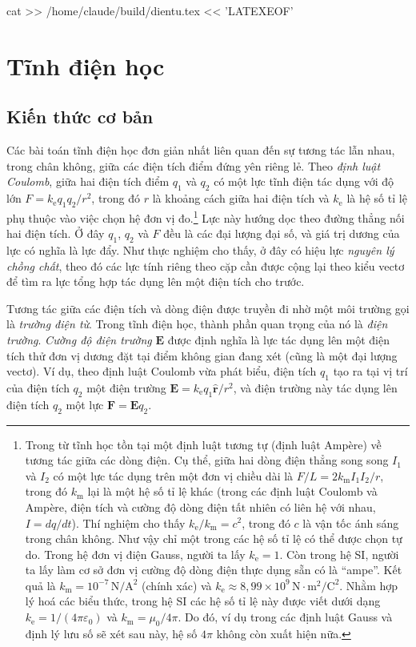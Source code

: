 cat >> /home/claude/build/dientu.tex << 'LATEXEOF'
\section{Tĩnh điện học}

\subsection{Kiến thức cơ bản}

Các bài toán tĩnh điện học đơn giản nhất liên quan đến sự tương tác lẫn nhau, trong chân không, giữa các điện tích điểm đứng yên riêng lẻ. Theo \emph{định luật Coulomb}, giữa hai điện tích điểm $q_1$ và $q_2$ có một lực tĩnh điện tác dụng với độ lớn $F = k_\mathrm{e} q_1 q_2/r^2$, trong đó $r$ là khoảng cách giữa hai điện tích và $k_\mathrm{e}$ là hệ số tỉ lệ phụ thuộc vào việc chọn hệ đơn vị đo.\footnote{Trong từ tĩnh học tồn tại một định luật tương tự (định luật Ampère) về tương tác giữa các dòng điện. Cụ thể, giữa hai dòng điện thẳng song song $I_1$ và $I_2$ có một lực tác dụng trên một đơn vị chiều dài là $F/L = 2k_\mathrm{m}I_1I_2/r$, trong đó $k_\mathrm{m}$ lại là một hệ số tỉ lệ khác (trong các định luật Coulomb và Ampère, điện tích và cường độ dòng điện tất nhiên có liên hệ với nhau, $I=dq/dt$). Thí nghiệm cho thấy $k_\mathrm{e}/k_\mathrm{m}=c^2$, trong đó $c$ là vận tốc ánh sáng trong chân không. Như vậy chỉ một trong các hệ số tỉ lệ có thể được chọn tự do. Trong hệ đơn vị điện Gauss, người ta lấy $k_\mathrm{e}=1$. Còn trong hệ SI, người ta lấy làm cơ sở đơn vị cường độ dòng điện thực dụng sẵn có là ``ampe''. Kết quả là $k_\mathrm{m}=10^{-7}\,\mathrm{N/A^2}$ (chính xác) và $k_\mathrm{e}\approx 8{,}99\times10^9\,\mathrm{N\cdot m^2/C^2}$. Nhằm hợp lý hoá các biểu thức, trong hệ SI các hệ số tỉ lệ này được viết dưới dạng $k_\mathrm{e}=1/(4\pi\varepsilon_0)$ và $k_\mathrm{m}=\mu_0/4\pi$. Do đó, ví dụ trong các định luật Gauss và định lý lưu số sẽ xét sau này, hệ số $4\pi$ không còn xuất hiện nữa.} Lực này hướng dọc theo đường thẳng nối hai điện tích. Ở đây $q_1$, $q_2$ và $F$ đều là các đại lượng đại số, và giá trị dương của lực có nghĩa là lực đẩy. Như thực nghiệm cho thấy, ở đây có hiệu lực \emph{nguyên lý chồng chất}, theo đó các lực tính riêng theo cặp cần được cộng lại theo kiểu vectơ để tìm ra lực tổng hợp tác dụng lên một điện tích cho trước.

Tương tác giữa các điện tích và dòng điện được truyền đi nhờ một môi trường gọi là \emph{trường điện từ}. Trong tĩnh điện học, thành phần quan trọng của nó là \emph{điện trường}. \emph{Cường độ điện trường} $\mathbf{E}$ được định nghĩa là lực tác dụng lên một điện tích thử đơn vị dương đặt tại điểm không gian đang xét (cũng là một đại lượng vectơ). Ví dụ, theo định luật Coulomb vừa phát biểu, điện tích $q_1$ tạo ra tại vị trí của điện tích $q_2$ một điện trường $\mathbf{E} = k_\mathrm{e} q_1 \hat{\mathbf{r}}/r^2$, và điện trường này tác dụng lên điện tích $q_2$ một lực $\mathbf{F}=\mathbf{E}q_2$.

